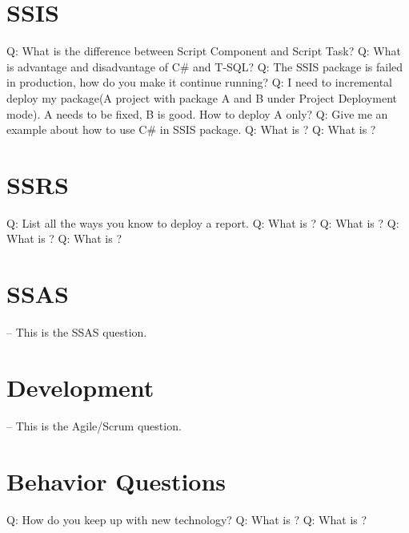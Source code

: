 \documentclass[a4paper,11pt]{article}
\begin{document}
\section{SSIS}
Q: What is the difference between Script Component and Script Task? \newline \newline
\noindent 
Q: What is advantage and disadvantage of C\# and T-SQL? \newline \newline
\noindent 
Q: The SSIS package is failed in production, how do you make it continue running? \newline \newline
\noindent 
Q: I need to incremental deploy my package(A project with package A and B under Project Deployment mode). A needs to be fixed, B is good. How to deploy A only? \newline \newline
\noindent 
Q: Give me an example about how to use C\# in SSIS package. \newline \newline
\noindent 
Q: What is ? \newline \newline
\noindent 
Q: What is ? \newline \newline

\section{SSRS}
Q: List all the ways you know to deploy a report.\newline \newline
\noindent 
Q: What is ? \newline \newline
\noindent 
Q: What is ? \newline \newline
\noindent 
Q: What is ? \newline \newline
\noindent 
Q: What is ? \newline \newline

\section{SSAS}
-- This is the SSAS question.

\section{Development}
-- This is the Agile/Scrum question.

\section{Behavior Questions}
Q: How do you keep up with new technology? \newline \newline
\noindent 
Q: What is ? \newline \newline
\noindent 
Q: What is ? \newline \newline
\end{document}
